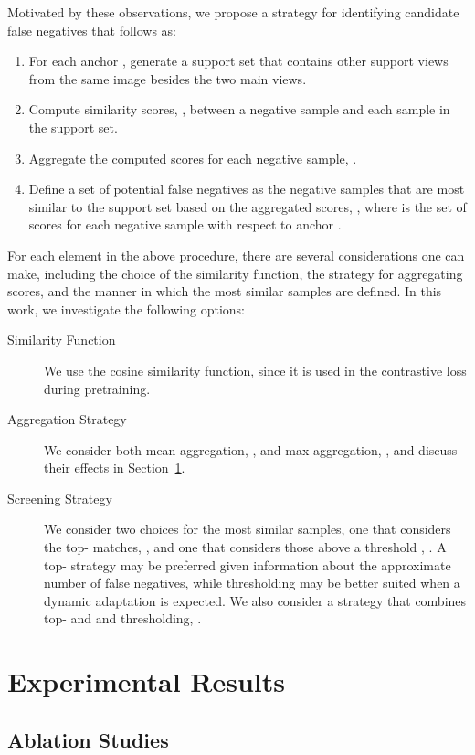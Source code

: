\documentclass[10pt,twocolumn,letterpaper]{article}
\begin{document}
Motivated by these observations, we propose a strategy for identifying candidate false negatives that follows as:
\begin{enumerate}
    \item For each anchor , generate a support set  that contains other support views from the same image besides the two main views.
\item Compute similarity scores, , between a negative sample 
and each sample  in the support set.
\item Aggregate the computed scores for each negative sample, .
\item Define a set of potential false negatives  as the negative samples that are most similar to the support set based on the aggregated scores, , where  is the set of scores for each negative sample with respect to anchor .
\end{enumerate}
For each element in the above procedure, there are several considerations one can make, including the choice of the similarity function, the strategy for aggregating scores, and the manner in which the most similar samples are defined. In this work, we investigate the following options:
\begin{description}
    \item[Similarity Function] We use the cosine similarity function, since it is used in the contrastive loss during pretraining.
\item[Aggregation Strategy] We consider both mean aggregation, , and max aggregation, , and discuss their effects in Section~\ref{sec:experiments}.
\item[Screening Strategy] We consider two choices for the most similar samples, one that considers the top- matches, , and one that considers those above a threshold , . A top- strategy may be preferred given information about the approximate number of false negatives, while thresholding may be better suited when a dynamic adaptation is expected. We also consider a strategy that combines top- and and thresholding, .
\end{description}
 \section{Experimental Results}
\label{sec:experiments}



\subsection{Ablation Studies}
\end{document}
